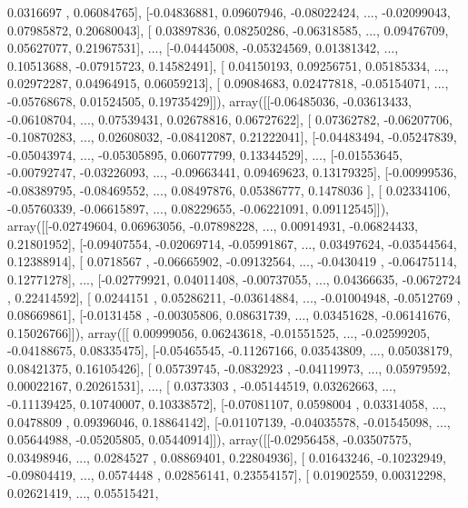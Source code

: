 \documentclass{article}
\begin{document}
         0.0316697 ,  0.06084765],
       [-0.04836881,  0.09607946, -0.08022424, ..., -0.02099043,
         0.07985872,  0.20680043],
       [ 0.03897836,  0.08250286, -0.06318585, ...,  0.09476709,
         0.05627077,  0.21967531],
       ..., 
       [-0.04445008, -0.05324569,  0.01381342, ...,  0.10513688,
        -0.07915723,  0.14582491],
       [ 0.04150193,  0.09256751,  0.05185334, ...,  0.02972287,
         0.04964915,  0.06059213],
       [ 0.09084683,  0.02477818, -0.05154071, ..., -0.05768678,
         0.01524505,  0.19735429]]), array([[-0.06485036, -0.03613433, -0.06108704, ...,  0.07539431,
         0.02678816,  0.06727622],
       [ 0.07362782, -0.06207706, -0.10870283, ...,  0.02608032,
        -0.08412087,  0.21222041],
       [-0.04483494, -0.05247839, -0.05043974, ..., -0.05305895,
         0.06077799,  0.13344529],
       ..., 
       [-0.01553645, -0.00792747, -0.03226093, ..., -0.09663441,
         0.09469623,  0.13179325],
       [-0.00999536, -0.08389795, -0.08469552, ...,  0.08497876,
         0.05386777,  0.1478036 ],
       [ 0.02334106, -0.05760339, -0.06615897, ...,  0.08229655,
        -0.06221091,  0.09112545]]), array([[-0.02749604,  0.06963056, -0.07898228, ...,  0.00914931,
        -0.06824433,  0.21801952],
       [-0.09407554, -0.02069714, -0.05991867, ...,  0.03497624,
        -0.03544564,  0.12388914],
       [ 0.0718567 , -0.06665902, -0.09132564, ..., -0.0430419 ,
        -0.06475114,  0.12771278],
       ..., 
       [-0.02779921,  0.04011408, -0.00737055, ...,  0.04366635,
        -0.0672724 ,  0.22414592],
       [ 0.0244151 ,  0.05286211, -0.03614884, ..., -0.01004948,
        -0.0512769 ,  0.08669861],
       [-0.0131458 , -0.00305806,  0.08631739, ...,  0.03451628,
        -0.06141676,  0.15026766]]), array([[ 0.00999056,  0.06243618, -0.01551525, ..., -0.02599205,
        -0.04188675,  0.08335475],
       [-0.05465545, -0.11267166,  0.03543809, ...,  0.05038179,
         0.08421375,  0.16105426],
       [ 0.05739745, -0.0832923 , -0.04119973, ...,  0.05979592,
         0.00022167,  0.20261531],
       ..., 
       [ 0.0373303 , -0.05144519,  0.03262663, ..., -0.11139425,
         0.10740007,  0.10338572],
       [-0.07081107,  0.0598004 ,  0.03314058, ...,  0.0478809 ,
         0.09396046,  0.18864142],
       [-0.01107139, -0.04035578, -0.01545098, ...,  0.05644988,
        -0.05205805,  0.05440914]]), array([[-0.02956458, -0.03507575,  0.03498946, ...,  0.0284527 ,
         0.08869401,  0.22804936],
       [ 0.01643246, -0.10232949, -0.09804419, ...,  0.0574448 ,
         0.02856141,  0.23554157],
       [ 0.01902559,  0.00312298,  0.02621419, ...,  0.05515421,
\end{document}
